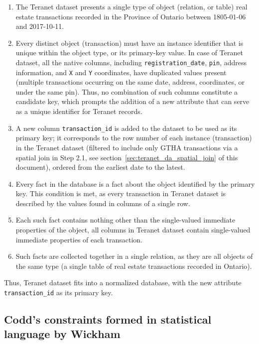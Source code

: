 \documentclass[11pt]{article}
\begin{document}
    \begin{enumerate}
        \item The Teranet dataset presents a single type of object (relation, or table) \textemdash real estate transactions recorded in the Province of Ontario between 1805-01-06 and 2017-10-11.
        \item Every distinct object (transaction) must have an instance identifier that is unique within the object type, or its primary-key value.
        In case of Teranet dataset, all the native columns, including \texttt{registration\_date}, \texttt{pin}, address information, and \texttt{X} and \texttt{Y} coordinates, have duplicated values present (multiple transactions occurring on the same date, address, coordinates, or under the same pin).
        Thus, no combination of such columns constitute a candidate key, which prompts the addition of a new attribute that can serve as a unique identifier for Teranet records.
        \item A new column \texttt{transaction\_id} is added to the dataset to be used as its primary key;
        it corresponds to the row number of each instance (transaction) in the Teranet dataset (filtered to include only GTHA transactions via a spatial join in Step 2.1, see section~\ref{sec:teranet_da_spatial_join} of this document), ordered from the earliest date to the latest.
        \item Every fact in the database is a fact about the object identified by the primary key.
        This condition is met, as every transaction in Teranet dataset is described by the values found in columns of a single row.
        \item Each such fact contains nothing other than the single-valued immediate properties of the object, all columns in Teranet dataset contain single-valued immediate properties of each transaction.
        \item Such facts are collected together in a single relation, as they are all objects of the same type (a single table of real estate transactions recorded in Ontario).
    \end{enumerate}

    Thus, Teranet dataset fits into a normalized database, with the new attribute \texttt{transaction\_id} as its primary key.

    \subsection{Codd's constraints formed in statistical language by Wickham} \label{subsec:teranet_tidy_data}
\end{document}
